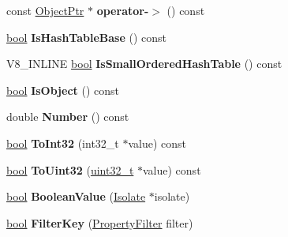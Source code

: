\begin{DoxyCompactItemize}
const \mbox{\hyperlink{classv8_1_1internal_1_1ObjectPtr}{Object\+Ptr}} $\ast$ {\bfseries operator-\/$>$} () const
\item 
\mbox{\label{classv8_1_1internal_1_1ObjectPtr_a69ea278d918c943e6ce9114176b32e40}} 
\mbox{\hyperlink{classbool}{bool}} {\bfseries Is\+Hash\+Table\+Base} () const
\item 
\mbox{\label{classv8_1_1internal_1_1ObjectPtr_a149aa58fc12ac0840cb89af4160b3cbd}} 
V8\+\_\+\+I\+N\+L\+I\+NE \mbox{\hyperlink{classbool}{bool}} {\bfseries Is\+Small\+Ordered\+Hash\+Table} () const
\item 
\mbox{\label{classv8_1_1internal_1_1ObjectPtr_a8408a8d5aeaa3f85a8094db1089fb2a5}} 
\mbox{\hyperlink{classbool}{bool}} {\bfseries Is\+Object} () const
\item 
\mbox{\label{classv8_1_1internal_1_1ObjectPtr_a247ef5804a080b0b019f158f402cd6f5}} 
double {\bfseries Number} () const
\item 
\mbox{\label{classv8_1_1internal_1_1ObjectPtr_ad1cd35d81333f17b6939ba79be5b0622}} 
\mbox{\hyperlink{classbool}{bool}} {\bfseries To\+Int32} (int32\+\_\+t $\ast$value) const
\item 
\mbox{\label{classv8_1_1internal_1_1ObjectPtr_a6de9686f728414ff6d5ab1f71797ef28}} 
\mbox{\hyperlink{classbool}{bool}} {\bfseries To\+Uint32} (\mbox{\hyperlink{classuint32__t}{uint32\+\_\+t}} $\ast$value) const
\item 
\mbox{\label{classv8_1_1internal_1_1ObjectPtr_ad16a4dfaf905d1f838c06720284db67e}} 
\mbox{\hyperlink{classbool}{bool}} {\bfseries Boolean\+Value} (\mbox{\hyperlink{classv8_1_1internal_1_1Isolate}{Isolate}} $\ast$isolate)
\item 
\mbox{\label{classv8_1_1internal_1_1ObjectPtr_abcef96049fae84f5ba65f40015163c89}} 
\mbox{\hyperlink{classbool}{bool}} {\bfseries Filter\+Key} (\mbox{\hyperlink{namespacev8_afbf02b6b1152a3e25d7bde90798209ac}{Property\+Filter}} filter)
\item 

\end{DoxyCompactItemize}
